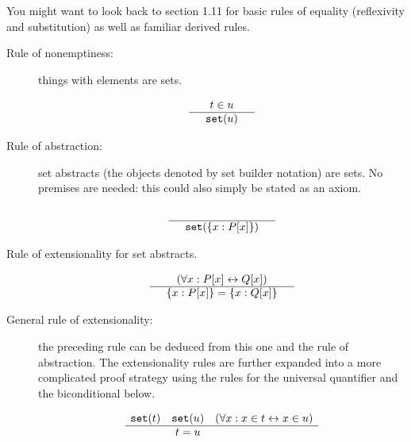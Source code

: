 \documentclass[12pt]{book}
\begin{document}
You might want to look back to section 1.11 for basic rules of equality (reflexivity and substitution) as well as familiar derived rules.

\begin{description}

\item[Rule of nonemptiness:]  things with elements are sets.

$$\begin{array}{ccc}

  & t \in u  &  \\ \hline

  & {\tt set}(u)&  \end{array}$$

\item[Rule of abstraction:]  set abstracts (the objects denoted by set builder notation) are sets.  No premises are needed:  this could also simply be stated as an axiom.

$$\begin{array}{ccc}

& &\\ \hline

  & {\tt set}(\{x:P[x]\}) &  

  \end{array}$$

\item[Rule of extensionality for set abstracts.]

$$\begin{array}{ccc}

& (\forall x:P[x] \leftrightarrow Q[x])&\\ \hline

  & \{x:P[x]\} = \{x:Q[x]\} &  

    \end{array}$$

\item[General rule of extensionality:]  the preceding rule can be deduced from this one and the rule of abstraction.  The extensionality rules are further expanded into a more complicated proof strategy using the rules for the universal quantifier and the biconditional below.

$$\begin{array}{ccc}

{\tt set}(t)  &{\tt set}(u)  &  (\forall x:x \in t \leftrightarrow x \in u) \\ \hline

  & t=u &  \end{array}$$


\end{description}
\end{document}
